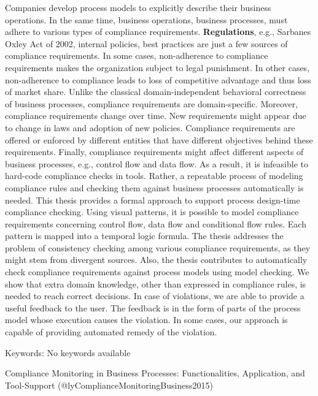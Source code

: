 \documentclass[
  letterpaper,
  DIV=11,
  numbers=noendperiod]{scrartcl}
\begin{document}
Companies develop process models to explicitly describe their business
operations. In the same time, business operations, business processes,
must adhere to various types of compliance requirements.
\textbf{Regulations}, e.g., Sarbanes Oxley Act of 2002, internal
policies, best practices are just a few sources of compliance
requirements. In some cases, non-adherence to compliance requirements
makes the organization subject to legal punishment. In other cases,
non-adherence to compliance leads to loss of competitive advantage and
thus loss of market share. Unlike the classical domain-independent
behavioral correctness of business processes, compliance requirements
are domain-specific. Moreover, compliance requirements change over time.
New requirements might appear due to change in laws and adoption of new
policies. Compliance requirements are offered or enforced by different
entities that have different objectives behind these requirements.
Finally, compliance requirements might affect different aspects of
business processes, e.g., control flow and data flow. As a result, it is
infeasible to hard-code compliance checks in tools. Rather, a repeatable
process of modeling compliance rules and checking them against business
processes automatically is needed. This thesis provides a formal
approach to support process design-time compliance checking. Using
visual patterns, it is possible to model compliance requirements
concerning control flow, data flow and conditional flow rules. Each
pattern is mapped into a temporal logic formula. The thesis addresses
the problem of consistency checking among various compliance
requirements, as they might stem from divergent sources. Also, the
thesis contributes to automatically check compliance requirements
against process models using model checking. We show that extra domain
knowledge, other than expressed in compliance rules, is needed to reach
correct decisions. In case of violations, we are able to provide a
useful feedback to the user. The feedback is in the form of parts of the
process model whose execution causes the violation. In some cases, our
approach is capable of providing automated remedy of the violation.

Keywords: No keywords available

Compliance Monitoring in Business Processes: Functionalities,
Application, and Tool-Support (@lyComplianceMonitoringBusiness2015)
\end{document}
